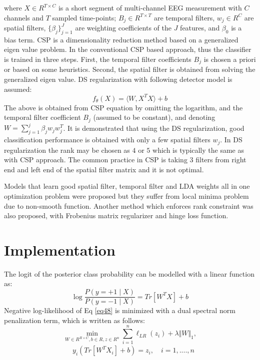 where $X \in R^{T\times C}$ is a short segment of multi-channel EEG measurement with $C$ channels and $T$ sampled time-points; $B_j \in R^{T\times T}$ are temporal filters, $w_j \in R^C$ are spatial filters, $\lbrace\beta_j\rbrace_{j=1}^J$ are weighting coefficients of the $J$ features, and $\beta_0$ is a bias term. CSP is a dimensionality reduction method based on a generalized eigen value problem. In the conventional CSP based approach, thus the classifier is trained in three steps. First, the temporal filter coefficients $B_j$ is chosen a priori or based on some heuristics. Second, the spatial filter is obtained from solving the generalized eigen value. DS regularization with following detector model is assumed: 
\begin{equation}
f_\theta\left(X\right)=\langle W,X^T X\rangle+b
\end{equation}
The above is obtained from CSP equation by omitting the logarithm, and the temporal filter coefficient $B_j$ (assumed to be constant), and denoting $W=\sum_{j=1}^j \beta_j w_j w_j^T$. It is demonstrated that using the DS regularization, good classification performance is obtained with only a few spatial filters $w_j$. In DS regularization the rank may be chosen as $4$ or $5$ which is typically the same as with CSP approach. The common practice in CSP is taking $3$ filters from right end and left end of the spatial filter matrix and it is not optimal.
  
Models that learn good spatial filter, temporal filter and LDA weights all in one optimization problem were proposed but they suffer from local minima problem due to non-smooth function. Another method which enforces rank constraint was also proposed, with Frobenius matrix regularizer and hinge loss function.

 \section{Implementation}

The logit of the posterior class probability can be modelled with a linear function as:
  \begin{equation}
  \log{\frac{P\left(y=+1\mid X\right)}{P\left(y=-1\mid X\right)}}=Tr[W^T X]+b
  \end{equation}
Negative log-likelihood of Eq \ref{eq48} is minimized with a dual spectral norm penalization term, which is written as follows:
\begin{equation}\label{eq416}
\min_{W\in R^{R\times C},b\in R, z\in R^n} \sum_{i=1}^n \ell_{LR}\left(z_i\right)+\lambda \Vert W\Vert_1,
\end{equation}
\begin{eqnarray*}
 \quad   y_i\left(Tr[W^T X_i]+b\right)=z_i, \quad
 i=1,....,n
\end{eqnarray*}


